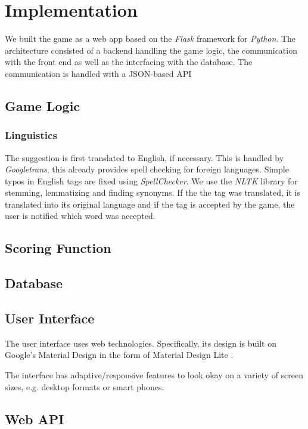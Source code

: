 \section{Implementation}
\label{gXLII:sec:implementation}  %


We built the game as a web app based on the \textit{Flask} framework for \textit{Python}. The architecture consisted of a backend handling the game logic, the communication with the front end as well as the interfacing with the database. The communication is handled with a JSON-based API

\subsection{Game Logic}
\label{gXLII:sec:implementation:game}  %



\subsubsection{Linguistics}
The suggestion is first translated to English, if necessary. This is handled by \textit{Googletrans}, this already provides spell checking for foreign languages.
Simple typos in English tags are fixed using \textit{SpellChecker}. We use the \textit{NLTK} library for stemming, lemmatizing and finding synonyms. If the the tag was translated, it is translated into its original language and if the tag is accepted by the game, the user is notified which word was accepted. 

\subsection{Scoring Function}

\subsection{Database}
\label{gXLII:sec:implementation:database}  %


\subsection{User Interface}
\label{gXLII:sec:implementation:UI}  %

The user interface uses web technologies. Specifically, its design is built on Google's Material Design in the form of Material Design Lite . 

The interface has adaptive/responsive features to look okay on a variety of screen sizes, e.g. desktop formats or smart phones. 

\subsection{Web API}
\label{gXLII:sec:implementation:API}  %




